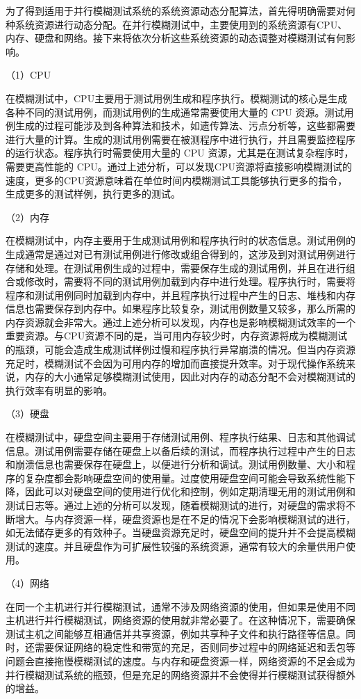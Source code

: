 \documentclass[master]{thesis-uestc}
\begin{document}
为了得到适用于并行模糊测试系统的系统资源动态分配算法，首先得明确需要对何种系统资源进行动态分配。在并行模糊测试中，主要使用到的系统资源有CPU、内存、硬盘和网络。接下来将依次分析这些系统资源的动态调整对模糊测试有何影响。

（1）CPU

在模糊测试中，CPU主要用于测试用例生成和程序执行。模糊测试的核心是生成各种不同的测试用例，而测试用例的生成通常需要使用大量的 CPU 资源。测试用例生成的过程可能涉及到各种算法和技术，如遗传算法、污点分析等，这些都需要进行大量的计算。生成的测试用例需要在被测程序中进行执行，并且需要监控程序的运行状态。程序执行时需要使用大量的 CPU 资源，尤其是在测试复杂程序时，需要更高性能的 CPU。通过上述分析，可以发现CPU资源将直接影响模糊测试的速度，更多的CPU资源意味着在单位时间内模糊测试工具能够执行更多的指令，生成更多的测试样例，执行更多的测试。

（2）内存

在模糊测试中，内存主要用于生成测试用例和程序执行时的状态信息。测试用例的生成通常是通过对已有测试用例进行修改或组合得到的，这涉及到对测试用例进行存储和处理。在测试用例生成的过程中，需要保存生成的测试用例，并且在进行组合或修改时，需要将不同的测试用例加载到内存中进行处理。程序执行时，需要将程序和测试用例同时加载到内存中，并且程序执行过程中产生的日志、堆栈和内存信息也需要保存到内存中。如果程序比较复杂，测试用例数量又较多，那么所需的内存资源就会非常大。通过上述分析可以发现，内存也是影响模糊测试效率的一个重要资源。与CPU资源不同的是，当可用内存较少时，内存资源将成为模糊测试的瓶颈，可能会造成生成测试样例过慢和程序执行异常崩溃的情况。但当内存资源充足时，模糊测试不会因为可用内存的增加而直接提升效率。对于现代操作系统来说，内存的大小通常足够模糊测试使用，因此对内存的动态分配不会对模糊测试的执行效率有明显的影响。

（3）硬盘

在模糊测试中，硬盘空间主要用于存储测试用例、程序执行结果、日志和其他调试信息。测试用例需要存储在硬盘上以备后续的测试，而程序执行过程中产生的日志和崩溃信息也需要保存在硬盘上，以便进行分析和调试。测试用例数量、大小和程序的复杂度都会影响硬盘空间的使用量。过度使用硬盘空间可能会导致系统性能下降，因此可以对硬盘空间的使用进行优化和控制，例如定期清理无用的测试用例和测试日志等。通过上述的分析可以发现，随着模糊测试的进行，对硬盘的需求将不断增大。与内存资源一样，硬盘资源也是在不足的情况下会影响模糊测试的进行，如无法储存更多的有效种子。当硬盘资源充足时，硬盘空间的提升并不会提高模糊测试的速度。并且硬盘作为可扩展性较强的系统资源，通常有较大的余量供用户使用。

（4）网络

在同一个主机进行并行模糊测试，通常不涉及网络资源的使用，但如果是使用不同主机进行并行模糊测试，网络资源的使用就非常必要了。在这种情况下，需要确保测试主机之间能够互相通信并共享资源，例如共享种子文件和执行路径等信息。同时，还需要保证网络的稳定性和带宽的充足，否则同步过程中的网络延迟和丢包等问题会直接拖慢模糊测试的速度。与内存和硬盘资源一样，网络资源的不足会成为并行模糊测试系统的瓶颈，但是充足的网络资源并不会使得并行模糊测试获得额外的增益。
\end{document}
